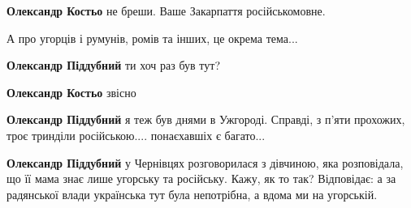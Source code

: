 \begin{itemize}
\begin{itemize}
\textbf{Олександр Костьо} не бреши. Ваше Закарпаття російськомовне.

 
А про угорців і румунів, ромів та інших, це окрема тема...

 
\textbf{Олександр Піддубний} ти хоч раз був тут?

 
\textbf{Олександр Костьо} звісно

 
\textbf{Олександр Піддубний} я теж був днями в Ужгороді. Справді, з п'яти прохожих, троє тринділи російською.... понаєхавшіх є багато...

 
\textbf{Олександр Піддубний} у Чернівцях розговорилася з дівчиною, яка
розповідала, що її мама знає лише угорську та російську. Кажу, як то так?
Відповідає: а за радянської влади українська тут була непотрібна, а вдома ми на
угорській.

 

\end{itemize}
\end{itemize}
